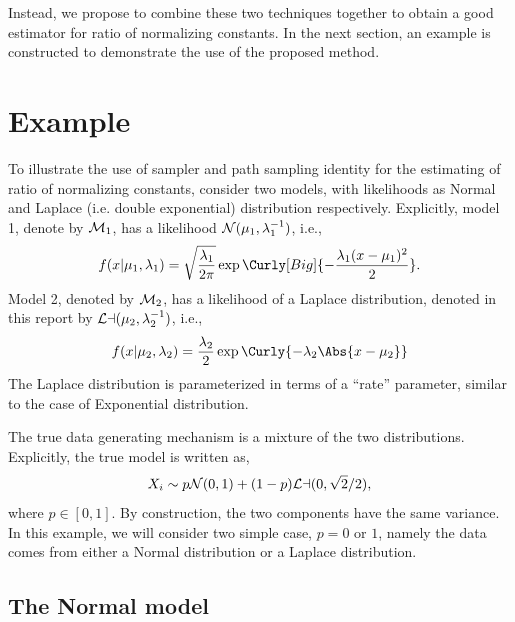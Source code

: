 Instead, we propose to combine these two techniques together to obtain a good
estimator for ratio of normalizing constants. In the next section, an example
is constructed to demonstrate the use of the proposed method.

\section{Example}
\label{sec:Example}

To illustrate the use of \smc sampler and path sampling identity for the
estimating of ratio of normalizing constants, consider two models, with
likelihoods as Normal and Laplace (i.e. double exponential) distribution
respectively. Explicitly, model 1, denote by
$\mathcal{M}_1$, has a likelihood
$\mathcal{N}(\mu_1,\lambda_1^{-1})$, i.e.,
\begin{equation}
  f(x|\mu_1,\lambda_1) = \sqrt{\frac{\lambda_1}{2\pi}}
  \exp\Curly[Big]{-\frac{\lambda_1(x-\mu_1)^2}{2}}.
\end{equation}
Model 2, denoted by $\mathcal{M}_2$, has a likelihood of a Laplace distribution,
denoted in this report by $\mathcal{La}(\mu_2,\lambda_2^{-1})$, i.e.,
\begin{equation}
  f(x|\mu_2,\lambda_2) = \frac{\lambda_2}{2}
  \exp\Curly{-\lambda_2\Abs{x - \mu_2}}
\end{equation}
The Laplace distribution is parameterized in terms of a ``rate'' parameter,
similar to the case of Exponential distribution.

The true data generating mechanism is a mixture of the two distributions.
Explicitly, the true model is written as,
\begin{equation}
  X_i \sim p\mathcal{N}(0,1) + (1-p)\mathcal{La}(0, \sqrt{2}/2),
  \label{eq:data_density}
\end{equation}
where $p\in[0,1]$. By construction, the two components have the same variance.
In this example, we will consider two simple case, $p = 0$ or $1$, namely the
data comes from either a Normal distribution or a Laplace distribution.

\subsection{The Normal model}

